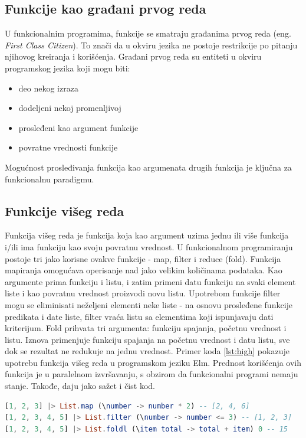 \documentclass[12pt,oneside]{memoir}
\begin{document}
\subsection{Funkcije kao građani prvog reda}
U funkcionalnim programima, funkcije se smatraju građanima prvog reda (eng.\emph{ First Class Citizen}). To znači da u okviru jezika ne postoje restrikcije po pitanju njihovog kreiranja i korišćenja. Građani prvog reda su entiteti u okviru programskog jezika koji mogu biti:
\begin{itemize}
\item deo nekog izraza
\item dodeljeni nekoj promenljivoj
\item prosleđeni kao argument funkcije
\item povratne vrednosti funkcije
\end{itemize}
Mogućnost prosleđivanja funkcija kao argumenata drugih funkcija je ključna za funkcionalnu paradigmu. 

\subsection{Funkcije višeg reda}
Funkcija višeg reda je funkcija koja kao argument uzima jednu ili više funkcija i/ili ima funkciju kao svoju povratnu vrednost. U funkcionalnom programiranju postoje tri jako korisne ovakve funkcije - map, filter i reduce (fold).  Funkcija mapiranja omogućava operisanje nad jako velikim količinama podataka. Kao argumente prima funkciju i listu, i zatim primeni datu funkciju na svaki element liste i kao povratnu vrednost proizvodi novu listu. Upotrebom funkcije filter mogu se eliminisati neželjeni elementi neke liste - na osnovu prosleđene funkcije predikata i date liste, filter vraća listu sa elementima koji ispunjavaju dati kriterijum. Fold prihvata tri argumenta: funkciju spajanja, početnu vrednost i listu. Iznova primenjuje funkciju spajanja na početnu vrednost i datu listu, sve dok se rezultat ne redukuje na jednu vrednost. Primer koda \ref{lst:high} pokazuje upotrebu funkcija višeg reda u programskom jeziku Elm. Prednost korišćenja ovih funkcija je u paralelnom izvršavanju, s obzirom da funkcionalni programi nemaju stanje. Takođe, daju jako sažet i čist kod.

\begin{lstlisting}[language=elm, caption={Funkcije višeg reda},captionpos=b, label={lst:high}]
[1, 2, 3] |> List.map (\number -> number * 2) -- [2, 4, 6]
[1, 2, 3, 4, 5] |> List.filter (\number -> number <= 3) -- [1, 2, 3]
[1, 2, 3, 4, 5] |> List.foldl (\item total -> total + item) 0 -- 15
\end{lstlisting}
\end{document}

